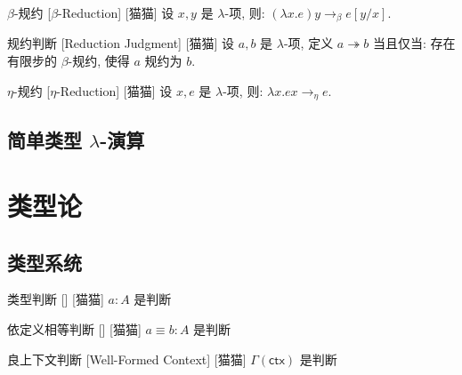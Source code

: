 \documentclass[UTF8]{ctexart}
\begin{document}
        \begin{rul}
            []
            {\(\beta\)-规约}
            [\(\beta\)-Reduction]
            [猫猫]
            设 \(x,y\) 是 \(\lambda\)-项, 则: \((\lambda x.e)y \rightarrow_\beta e[y/x]\).
        \end{rul}
        
        \begin{dfn}
            []
            {规约判断}
            [Reduction Judgment]
            [猫猫]
            设 \(a,b\) 是 \(\lambda\)-项, 定义 \(a \twoheadrightarrow b\) 当且仅当: 存在有限步的 \(\beta\)-规约, 使得 \(a\) 规约为 \(b\). 
        \end{dfn}
        
        \begin{rul}
            []
            {\(\eta\)-规约}
            [\(\eta\)-Reduction]
            [猫猫]
            设 \(x,e\) 是 \(\lambda\)-项, 则: \(\lambda x.ex \rightarrow_\eta e\). 

        \end{rul}

    \subsection{简单类型 \(\lambda\)-演算}

\section{类型论}

    \subsection{类型系统}
    
        \begin{dfn}
            []
            {类型判断}
            []
            [猫猫]
            \(a:A\) 是判断
        \end{dfn}
        
        \begin{dfn}
            []
            {依定义相等判断}
            []
            [猫猫]
            \(a \equiv b:A\) 是判断
        \end{dfn}
        
        \begin{dfn}
            []
            {良上下文判断}
            [Well-Formed Context]
            [猫猫]
            \(\Gamma(\mathsf{ctx})\) 是判断
        \end{dfn}
        
\end{document}
